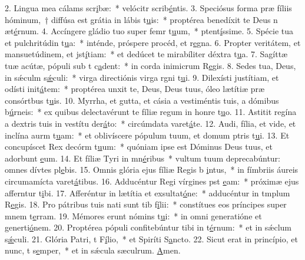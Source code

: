 2. Lingua mea cálams scr\uline{i}bæ:~* velócitr scrib\uline{é}ntis.
3. Speciósus forma præ fíliis hóminum,~† diffúsa est grátia in lábis t\uline{u}is:~* proptérea benedíxit te Deus n æt\uline{é}rnum.
4. Accíngere gládio tuo super femr t\uline{u}um,~* ptent\uline{í}ssime.
5. Spécie tua et pulchritúdin t\uline{u}a:~* inténde, próspere procéd, et r\uline{e}gna.
6. Propter veritátem, et mansuetúdinem, et jst\uline{í}tiam:~* et dedúcet te mirabíliter déxtra t\uline{u}a.
7. Sagíttæ tuæ acútæ, pópuli sub t c\uline{a}dent:~* in corda inimicrum R\uline{e}gis.
8. Sedes tua, Deus, in sǽculm s\uline{ǽ}culi:~* virga directiónis virga rgni t\uline{u}i.
9. Dilexísti justítiam, et odísti init\uline{á}tem:~* proptérea unxit te, Deus, Deus tuus, óleo lætítiæ præ consórtbus t\uline{u}is.
10. Myrrha, et gutta, et cásia a vestiméntis tuis, a dómibus b\uline{ú}rneis:~* ex quibus delectavérunt te fíliæ regum in honre t\uline{u}o.
11. Astitit regína a dextris tuis in vestítu der\uline{á}to:~* circúmdata varet\uline{á}te.
12. Audi, fília, et vide, et inclína aurm t\uline{u}am:~* et oblivíscere pópulum tuum, et domum ptris t\uline{u}i.
13. Et concupíscet Rex decórm t\uline{u}um:~* quóniam ipse est Dóminus Deus tuus, et adorbunt \uline{e}um.
14. Et fíliæ Tyri in mn\uline{é}ribus~* vultum tuum deprecabúntur: omnes dívtes pl\uline{e}bis.
15. Omnis glória ejus fíliæ Regis b \uline{i}ntus,~* in fímbriis áureis circumamícta varet\uline{á}tibus.
16. Adducéntur Regi vírgines pst \uline{e}am:~* próximæ ejus afferntur t\uline{i}bi.
17. Afferéntur in lætítia et exsultat\uline{ó}ne:~* adducéntur in tmplum R\uline{e}gis.
18. Pro pátribus tuis nati sunt tib f\uline{í}lii:~* constítues eos príncipes super mnem t\uline{e}rram.
19. Mémores erunt nómins t\uline{u}i:~* in omni generatióne et generti\uline{ó}nem.
20. Proptérea pópuli confitebúntur tibi in t\uline{é}rnum:~* et in sǽclum s\uline{ǽ}culi.
21. Glória Patri, t F\uline{í}lio,~* et Spiríti S\uline{a}ncto.
22. Sicut erat in princípio, et nunc, t s\uline{e}mper,~* et in sǽcula sæculrum. \uline{A}men.
